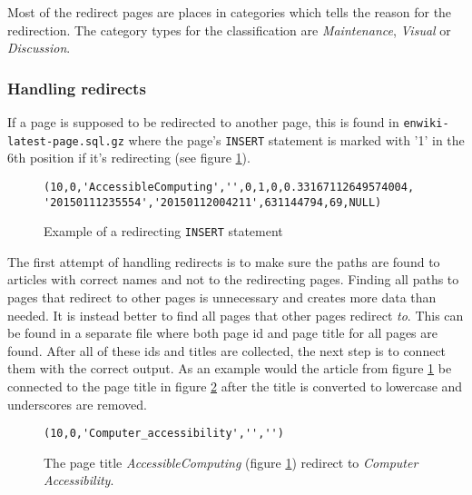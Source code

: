 Most of the redirect pages are places in categories which tells the reason for the redirection. The category types for the classification are \emph{Maintenance}, \emph{Visual} or \emph{Discussion}.

\subsubsection{Handling redirects}

If a page is supposed to be redirected to another page, this is found in \texttt{enwiki- latest-page.sql.gz} where the page's \texttt{INSERT} statement is marked with '1' in the 6th position if it's redirecting (see figure \ref{fig:isredirect}).

\begin{figure}[h]
\centering
\begin{lstlisting}
(10,0,'AccessibleComputing','',0,1,0,0.33167112649574004,
'20150111235554','20150112004211',631144794,69,NULL)
\end{lstlisting}
\caption{Example of a redirecting \texttt{INSERT} statement}
\label{fig:isredirect}
\end{figure}
The first attempt of handling redirects is to make sure the paths are found to articles with correct names and not to the redirecting pages. Finding all paths to pages that redirect to other pages is unnecessary and creates more data than needed. It is instead better to find all pages that other pages redirect \emph{to}. This can be found in a separate file \enwikiredirect where both page id and page title for all pages are found. After all of these ids and titles are collected, the next step is to connect them with the correct output. As an example would the article from figure \ref{fig:isredirect} be connected to the page title in figure \ref{fig:correctacccomp} after the title is converted to lowercase and underscores are removed. 

\begin{figure}[h]
\centering
\begin{lstlisting}
(10,0,'Computer_accessibility','','')
\end{lstlisting}
\caption[Example of a page redirecting to]{The page title \emph{AccessibleComputing} (figure \ref{fig:isredirect}) redirect to \emph{Computer Accessibility}.}
\label{fig:correctacccomp}
\end{figure}



